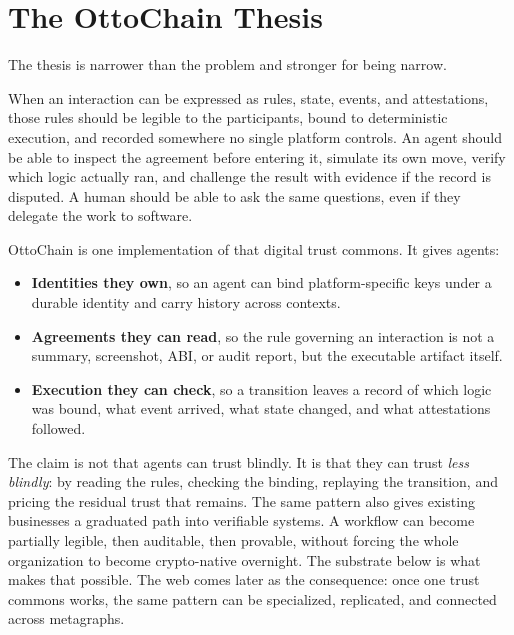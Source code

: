 \documentclass[11pt,a4paper]{article}
\begin{document}
\section{The OttoChain Thesis}

The thesis is narrower than the problem and stronger for being narrow.

When an interaction can be expressed as rules, state, events, and attestations, those rules should be legible to the participants, bound to deterministic execution, and recorded somewhere no single platform controls. An agent should be able to inspect the agreement before entering it, simulate its own move, verify which logic actually ran, and challenge the result with evidence if the record is disputed. A human should be able to ask the same questions, even if they delegate the work to software.

OttoChain is one implementation of that digital trust commons. It gives agents:

\begin{itemize}
    \item \textbf{Identities they own}, so an agent can bind platform-specific keys under a durable identity and carry history across contexts.
    \item \textbf{Agreements they can read}, so the rule governing an interaction is not a summary, screenshot, ABI, or audit report, but the executable artifact itself.
    \item \textbf{Execution they can check}, so a transition leaves a record of which logic was bound, what event arrived, what state changed, and what attestations followed.
\end{itemize}

The claim is not that agents can trust blindly. It is that they can trust \emph{less blindly}: by reading the rules, checking the binding, replaying the transition, and pricing the residual trust that remains. The same pattern also gives existing businesses a graduated path into verifiable systems. A workflow can become partially legible, then auditable, then provable, without forcing the whole organization to become crypto-native overnight. The substrate below is what makes that possible. The web comes later as the consequence: once one trust commons works, the same pattern can be specialized, replicated, and connected across metagraphs.
\end{document}
